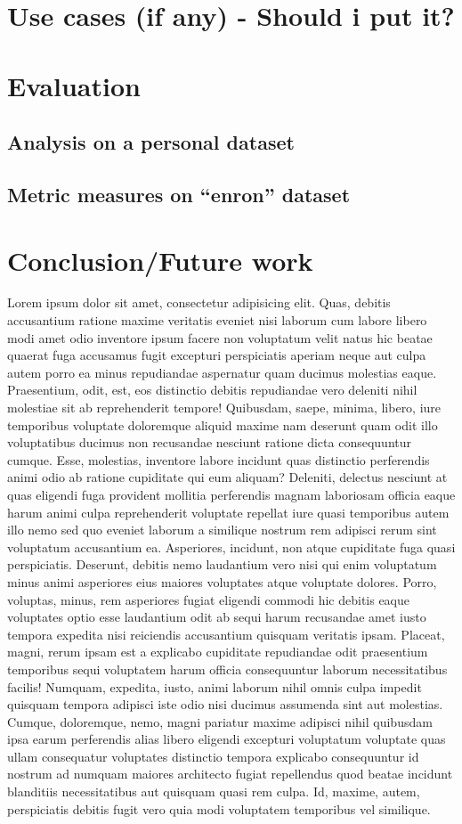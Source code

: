 \documentclass[a4paper,12pt]{report}
\begin{document}
\chapter{Use cases (if any) - Should i put it?}
\chapter{Evaluation}
\section{Analysis on a personal dataset}
\section{Metric measures on ``enron'' dataset}
\chapter{Conclusion/Future work}
Lorem ipsum dolor sit amet, consectetur adipisicing elit. Quas, debitis accusantium ratione maxime veritatis eveniet nisi laborum cum labore libero modi amet odio inventore ipsum facere non voluptatum velit natus hic beatae quaerat fuga accusamus fugit excepturi perspiciatis aperiam neque aut culpa autem porro ea minus repudiandae aspernatur quam ducimus molestias eaque. Praesentium, odit, est, eos distinctio debitis repudiandae vero deleniti nihil molestiae sit ab reprehenderit tempore! Quibusdam, saepe, minima, libero, iure temporibus voluptate doloremque aliquid maxime nam deserunt quam odit illo voluptatibus ducimus non recusandae nesciunt ratione dicta consequuntur cumque. Esse, molestias, inventore labore incidunt quas distinctio perferendis animi odio ab ratione cupiditate qui eum aliquam? Deleniti, delectus nesciunt at quas eligendi fuga provident mollitia perferendis magnam laboriosam officia eaque harum animi culpa reprehenderit voluptate repellat iure quasi temporibus autem illo nemo sed quo eveniet laborum a similique nostrum rem adipisci rerum sint voluptatum accusantium ea. Asperiores, incidunt, non atque cupiditate fuga quasi perspiciatis. Deserunt, debitis nemo laudantium vero nisi qui enim voluptatum minus animi asperiores eius maiores voluptates atque voluptate dolores. Porro, voluptas, minus, rem asperiores fugiat eligendi commodi hic debitis eaque voluptates optio esse laudantium odit ab sequi harum recusandae amet iusto tempora expedita nisi reiciendis accusantium quisquam veritatis ipsam. Placeat, magni, rerum ipsam est a explicabo cupiditate repudiandae odit praesentium temporibus sequi voluptatem harum officia consequuntur laborum necessitatibus facilis! Numquam, expedita, iusto, animi laborum nihil omnis culpa impedit quisquam tempora adipisci iste odio nisi ducimus assumenda sint aut molestias. Cumque, doloremque, nemo, magni pariatur maxime adipisci nihil quibusdam ipsa earum perferendis alias libero eligendi excepturi voluptatum voluptate quas ullam consequatur voluptates distinctio tempora explicabo consequuntur id nostrum ad numquam maiores architecto fugiat repellendus quod beatae incidunt blanditiis necessitatibus aut quisquam quasi rem culpa. Id, maxime, autem, perspiciatis debitis fugit vero quia modi voluptatem temporibus vel similique.
\end{document}
